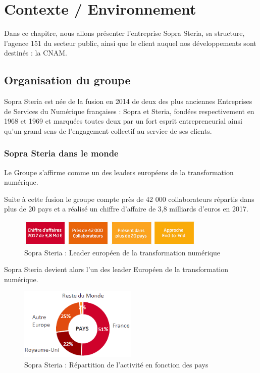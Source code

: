 \chapter{Contexte / Environnement}
\label{chap:premierchapitre}

Dans ce chapitre, nous allons présenter l'entreprise Sopra Steria, sa structure, l'agence 151 du secteur public, ainsi que le client auquel nos développements sont destinés : la CNAM.

\section{Organisation du groupe}

Sopra Steria est née de la fusion en 2014 de deux des plus anciennes Entreprises de Services du Numérique françaises : Sopra et Steria, fondées respectivement en 1968 et 1969 et marquées toutes deux par un fort esprit entrepreneurial ainsi qu'un grand sens de l’engagement collectif au service de ses clients.

\subsection{Sopra Steria dans le monde}

Le Groupe s'affirme comme un des leaders européens de la transformation numérique.

Suite à cette fusion le groupe compte près de 42 000 collaborateurs répartis dans plus de 20 pays et a réalisé un chiffre d’affaire de 3,8 milliards d’euros en 2017.

\begin{figure}[!h]
\centering
\includegraphics[width=0.8\textwidth]{images/chiffres_cles2017.jpg}
\caption{Sopra Steria : Leader européen de la transformation numérique}
\end{figure}

Sopra Steria devient alors l'un des leader Européen de la transformation numérique.

\begin{figure}[!h]
\centering
\includegraphics[width=0.5\textwidth]{images/payssoprasteria.png}
\caption{Sopra Steria : Répartition de l'activité en fonction des pays}
\end{figure}


